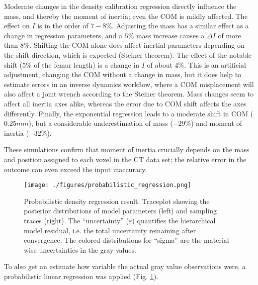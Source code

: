 Moderate changes in the density calibration regression directly influence the mass, and thereby the moment of inertia; even the COM is mildly affected.
The effect on \(I\) is in the order of \(7-8\%\).
Adjusting the mass has a similar effect as a change in regression parameters, and a \(5\%\) mass increase causes a \(\Delta I\) of more than \(8\%\).
Shifting the COM alone does affect inertial parameters depending on the shift direction, which is expected (Steiner theorem).
The effect of the notable shift (\(5\%\) of the femur length) is a change in \(I\) of about \(4\%\).
This is an artificial adjustment, changing the COM without a change in mass, but it does help to estimate errors in an inverse dynamics workflow, where a COM misplacement will also affect a joint wrench according to the Steiner theorem.
Mass changes seem to affect all inertia axes alike, whereas the error due to COM shift affects the axes differently.
Finally, the exponential regression leads to a moderate shift in COM (\(0.25 mm\)), but a considerable underestimation of mass (\(-29 \%\)) and moment of inertia (\(-32 \%\)).

These simulations confirm that moment of inertia crucially depends on the mass and position assigned to each voxel in the CT data set; the relative error in the outcome can even exceed the input inaccuracy.


\begin{figure}[htbp]
\centering
\texttt{[image: ./figures/probabilistic\_regression.png]}
\caption{\label{fig:probabilistic_density}Probabilistic density regression result. Traceplot showing the posterior distributions of model parameters (left) and sampling traces (right). The ``uncertainty'' (\(\varepsilon\)) quantifies the hierarchical model residual, i.e. the total uncertainty remaining after convergence. The colored distributions for ``sigma'' are the material-wise uncertainties in the gray values.}
\end{figure}

To also get an estimate how variable the actual gray value observations were, a probabilistic linear regression was applied (Fig. \ref{fig:probabilistic_density}).

